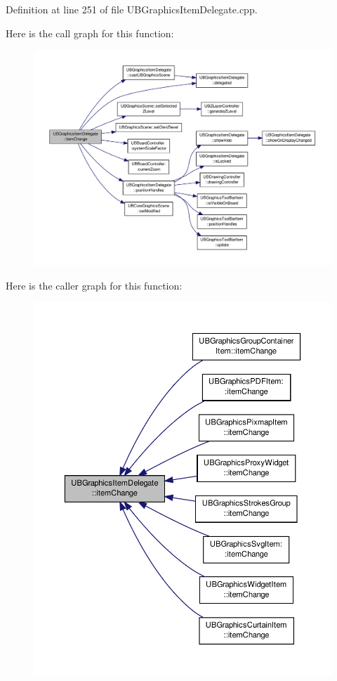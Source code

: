 Definition at line 251 of file U\-B\-Graphics\-Item\-Delegate.\-cpp.



Here is the call graph for this function\-:
\nopagebreak
\begin{figure}[H]
\begin{center}
\leavevmode
\includegraphics[width=350pt]{dd/dd5/class_u_b_graphics_item_delegate_a5851301422e4533173600b1264b852fb_cgraph}
\end{center}
\end{figure}




Here is the caller graph for this function\-:
\nopagebreak
\begin{figure}[H]
\begin{center}
\leavevmode
\includegraphics[width=350pt]{dd/dd5/class_u_b_graphics_item_delegate_a5851301422e4533173600b1264b852fb_icgraph}
\end{center}
\end{figure}


